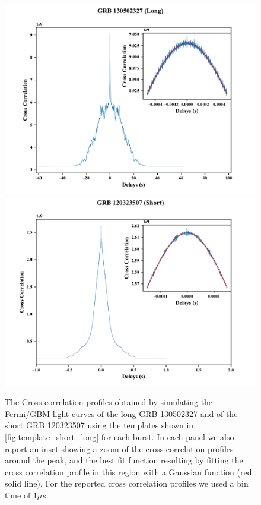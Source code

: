 \documentclass[]{spie}  %
\def \us{$\mu s$\xspace}
\begin{document}
\begin{figure}[h!]
\centering
\includegraphics[scale=0.52,angle=0]{fig/CrossCorrelation_fit_LONG.pdf}
\includegraphics[scale=0.52,angle=0]{fig/CrossCorrelation_fit_Short.pdf}

\caption{The Cross correlation profiles obtained by simulating the Fermi/GBM light curves of the long GRB 130502327 and of the short GRB 120323507 using the templates shown in \autoref{fig:template_short_long} for each burst. In each panel we also report an inset showing a zoom of the cross correlation profiles around the peak, and the best fit function resulting by fitting the cross correlation profile in this region with a Gaussian function (red solid line). For the reported cross correlation profiles we used a bin time of 1\us. } 
\label{fig:xc_profiles}
\end{figure}
\end{document}
